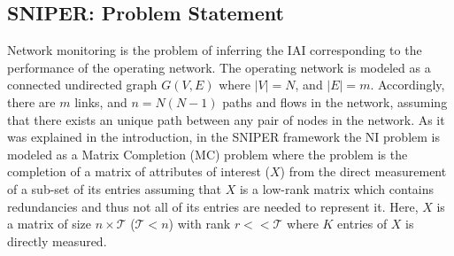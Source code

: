 \subsection{SNIPER: Problem Statement}   \label{subsec:ProbState}
Network monitoring is the problem of inferring the IAI corresponding to the performance of the operating network. The operating network is modeled as a connected undirected graph $G(V,E)$ where $|V|=N$, and $|E|=m$. Accordingly, there are $m$ links, and $n=N(N-1)$ paths and flows in the network, assuming that there exists an unique path between any pair of nodes in the network. As it was explained in the introduction, in the SNIPER framework the NI problem is modeled as a Matrix Completion (MC) problem where the problem is the completion of a matrix of attributes of interest ($X$) from the direct measurement of a sub-set of its entries assuming that $X$ is a low-rank matrix which contains redundancies and thus not all of its entries are needed to represent it. Here, $X$ is a matrix of size $n \times \mathcal{T}$ ($\mathcal{T}<n$) with rank $r << \mathcal{T}$ where $K$ entries of $X$ is directly measured.


